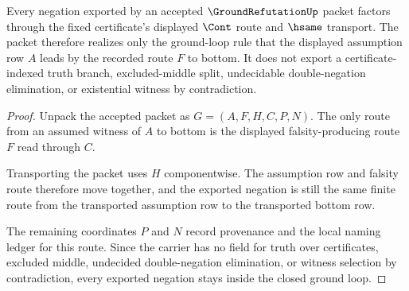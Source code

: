 \begin{theorem}
\label{thm:ground-refutation-ground-loop-boundary}
Every negation exported by an accepted $\GroundRefutationUp$ packet factors through the fixed certificate's displayed $\Cont$ route and $\hsame$ transport. The packet therefore realizes only the ground-loop rule that the displayed assumption row $A$ leads by the recorded route $F$ to bottom. It does not export a certificate-indexed truth branch, excluded-middle split, undecidable double-negation elimination, or existential witness by contradiction.
\end{theorem}
\begin{proof}
Unpack the accepted packet as $G=(A,F,H,C,P,N)$. The only route from an assumed witness of $A$ to bottom is the displayed falsity-producing route $F$ read through $C$.

Transporting the packet uses $H$ componentwise. The assumption row and falsity route therefore move together, and the exported negation is still the same finite route from the transported assumption row to the transported bottom row.

The remaining coordinates $P$ and $N$ record provenance and the local naming ledger for this route. Since the carrier has no field for truth over certificates, excluded middle, undecided double-negation elimination, or witness selection by contradiction, every exported negation stays inside the closed ground loop.
\end{proof}

